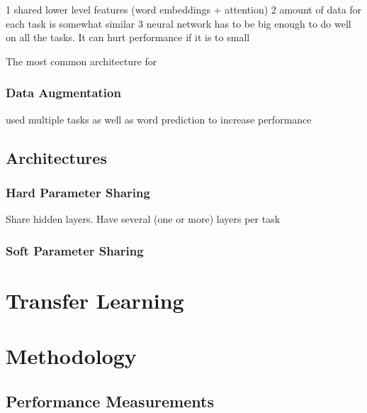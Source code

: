 1 shared lower level features (word embeddings + attention)
2 amount of data for each task is somewhat similar
3 neural network has to be big enough to do well on all the tasks. It can hurt performance if it is to small \cite{Caruana1997a}


The most common architecture for 

\subsubsection{Data Augmentation}

used multiple tasks as well as word prediction to increase performance \cite{Rei2017}


\subsection{Architectures}

\subsubsection{Hard Parameter Sharing}

Share hidden layers. Have several (one or more) layers per task 

\subsubsection{Soft Parameter Sharing}

\section{Transfer Learning}
\label{sec:TransferLearning}




























\section{Methodology}
\subsection{Performance Measurements}

